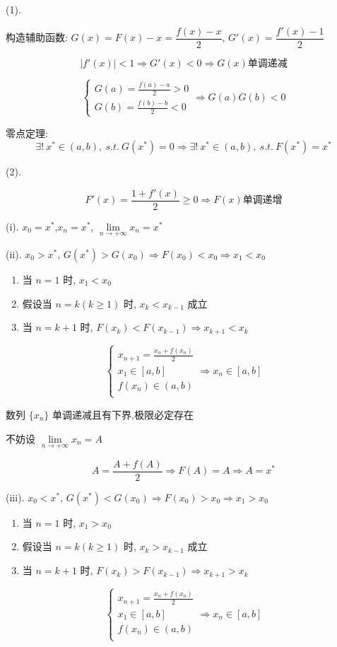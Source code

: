 \begin{solution}
	
	(1). 
	
	构造辅助函数: $G(x) = F(x)-x = \dfrac{f(x)-x}{2}$, $G'(x)=\dfrac{f'(x)-1}{2}$
	
	$$|f'(x)|<1\Rightarrow G'(x)<0\Rightarrow G(x)\text{单调递减}$$

	$$\begin{cases}
		G(a) = \frac{f(a)-a}{2}>0\\
		G(b) = \frac{f(b)-b}{2}<0
	\end{cases} \Rightarrow G(a)G(b)<0$$
	
	零点定理: 
	$$\exists!\ x^{*}\in(a,b),\ s.t.\ G(x^{*})=0\Rightarrow \exists!\ x^{*}\in(a,b),\ s.t.\ F(x^{*})=x^{*}$$
	
	(2). 

	$$F'(x)=\dfrac{1+f'(x)}{2}\geq 0\Rightarrow F(x)\text{单调递增}$$
	
	(i). $x_{0}=x^{*}$,$x_{n}=x^{*}$, $\lim\limits_{n\to +\infty}x_{n}=x^{*}$
	
	(ii). $x_{0}>x^{*}$, $G(x^{*})>G(x_{0})\Rightarrow F(x_{0})<x_{0}\Rightarrow x_{1}<x_{0}$
	\begin{enumerate}
		\item 当 $n=1$ 时, $x_{1}<x_{0}$
		\item 假设当 $n=k(k\geq 1)$ 时, $x_{k}<x_{k-1}$ 成立
		\item 当 $n=k+1$ 时, $F(x_{k})<F(x_{k-1})\Rightarrow x_{k+1}<x_{k}$
	\end{enumerate}
	$$\begin{cases}
		x_{n+1}=\frac{x_{n}+f(x_{n})}{2} \\
		x_{1}\in [a,b] \\
		f(x_{n})\in (a,b)\\
	\end{cases}\Rightarrow x_{n}\in [a,b]$$
	
	数列 $\{x_{n}\}$ 单调递减且有下界,极限必定存在
	
	不妨设 $\lim\limits_{n\to +\infty}x_{n} = A$
	
	$$A=\dfrac{A+f(A)}{2}\Rightarrow F(A)=A\Rightarrow A=x^{*}$$
	
	(iii). $x_{0}<x^{*}$, $G(x^{*})<G(x_{0})\Rightarrow F(x_{0})>x_{0}\Rightarrow x_{1}>x_{0}$
	\begin{enumerate}
		\item 当 $n=1$ 时, $x_{1}>x_{0}$
		\item 假设当 $n=k(k\geq 1)$ 时, $x_{k}>x_{k-1}$ 成立
		\item 当 $n=k+1$ 时, $F(x_{k})>F(x_{k-1})\Rightarrow x_{k+1}>x_{k}$
	\end{enumerate}
	$$\begin{cases}
		x_{n+1}=\frac{x_{n}+f(x_{n})}{2} \\
		x_{1}\in [a,b] \\
		f(x_{n})\in (a,b)\\
	\end{cases}\Rightarrow x_{n}\in [a,b]$$
	

\end{solution}
